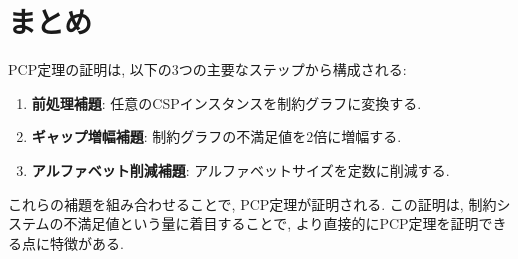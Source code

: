 \section{まとめ}

PCP定理の証明は, 以下の3つの主要なステップから構成される:

\begin{enumerate}
\item \textbf{前処理補題}: 任意のCSPインスタンスを制約グラフに変換する.

\item \textbf{ギャップ増幅補題}: 制約グラフの不満足値を2倍に増幅する.

\item \textbf{アルファベット削減補題}: アルファベットサイズを定数に削減する.
\end{enumerate}

これらの補題を組み合わせることで, PCP定理が証明される. この証明は, 制約システムの不満足値という量に着目することで, より直接的にPCP定理を証明できる点に特徴がある.